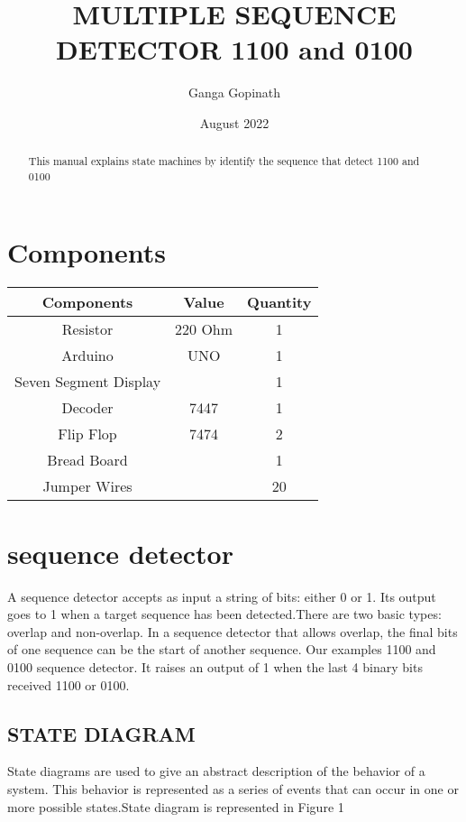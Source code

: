\documentclass[journal,12pt,twocolumn]{IEEEtran}
\title{ MULTIPLE SEQUENCE DETECTOR 1100 and 0100}
\author{Ganga Gopinath}
\date{August 2022}
\begin{document}
\maketitle
\begin{tableofcontents}
\begin{abstract}
This manual explains state machines by identify the sequence that detect 1100 and 0100
\end{abstract}
\section{Components}

\vspace{0.2cm}

\begin{table}[h]
\centering

\begin{tabular}{|c|c|c|}
\hline
Components & Value & Quantity\\
\hline
Resistor & 220 Ohm & 1\\
\hline
Arduino & UNO & 1\\
\hline
Seven Segment Display & & 1\\
\hline
Decoder & 7447 & 1\\
\hline
Flip Flop & 7474 & 2\\
\hline
Bread Board & & 1\\
\hline
Jumper Wires & & 20\\
\hline
\end{tabular}
\vspace{2mm}
\label{table:1}
\end{table}
\section{sequence detector}
  A sequence detector accepts as input a string of bits: either 0 or 1. Its output goes to 1 when a target sequence has been detected.There are two basic types:  overlap  and  non-overlap. In a sequence detector that allows overlap, the final bits of one sequence can be  the start of another sequence.  Our examples 1100 and 0100 sequence detector.  It raises an output of 1 when the last 4 binary bits received 1100 or 0100.
  \newline
\subsection{\textbf{STATE DIAGRAM}}
State diagrams are used to give an abstract description of the behavior of a system. This behavior is represented as a series of events that can occur in one or more possible states.State diagram is represented in Figure 1
\begin{figure}
 

\end{figure}
\end{tableofcontents}
\end{document}
